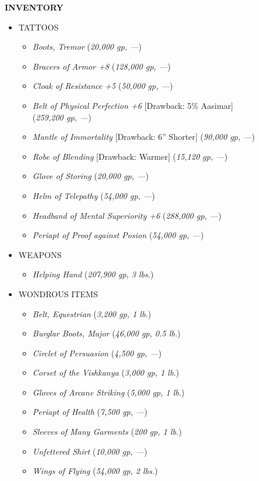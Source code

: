\newpage

\textbf{INVENTORY}

\vspace{10pt}

\begin{itemize}
\item TATTOOS
	\begin{itemize}
	\item \textit{Boots, Tremor} (\textit{20,000 gp, ---})
	\item \textit{Bracers of Armor +8} (\textit{128,000 gp, ---})
	\item \textit{Cloak of Resistance +5} (\textit{50,000 gp, ---})
	\item \textit{ \hspace{1pt} Belt of Physical Perfection +6} [Drawback: 5\% Aasimar] \\ (\textit{259,200 gp, ---})
	\item \textit{ \hspace{1pt} Mantle of Immortality} [Drawback: 6'' Shorter] (\textit{90,000 gp, ---})
	\item \textit{ \hspace{1pt} Robe of Blending} [Drawback: Warmer] (\textit{15,120 gp, ---})
	\item \textit{Glove of Storing} (\textit{20,000 gp, ---})
	\item \textit{Helm of Telepathy} (\textit{54,000 gp, ---})
	\item \textit{Headband of Mental Superiority +6} (\textit{288,000 gp, ---})
	\item \textit{Periapt of Proof against Posion} (\textit{54,000 gp, ---})
	\end{itemize}
\item WEAPONS
	\begin{itemize}
	\item \textit{Helping Hand} (\textit{207,900 gp, 3 lbs.})
	\end{itemize}
\item WONDROUS ITEMS
	\begin{itemize}
	\item \textit{Belt, Equestrian} (\textit{3,200 gp, 1 lb.})
	\item \textit{Burglar Boots, Major} (\textit{46,000 gp, 0.5 lb.})
	\item \textit{Circlet of Persuasion} (\textit{4,500 gp, ---})
	\item \textit{Corset of the Vishkanya} (\textit{3,000 gp, 1 lb.})
	\item \textit{Gloves of Arcane Striking} (\textit{5,000 gp, 1 lb.})
	\item \textit{Periapt of Health} (\textit{7,500 gp, ---})
	\item \textit{Sleeves of Many Garments} (\textit{200 gp, 1 lb.})
	\item \textit{Unfettered Shirt} (\textit{10,000 gp, ---})
	\item \textit{Wings of Flying} (\textit{54,000 gp, 2 lbs.})
	\end{itemize}
\end{itemize}


